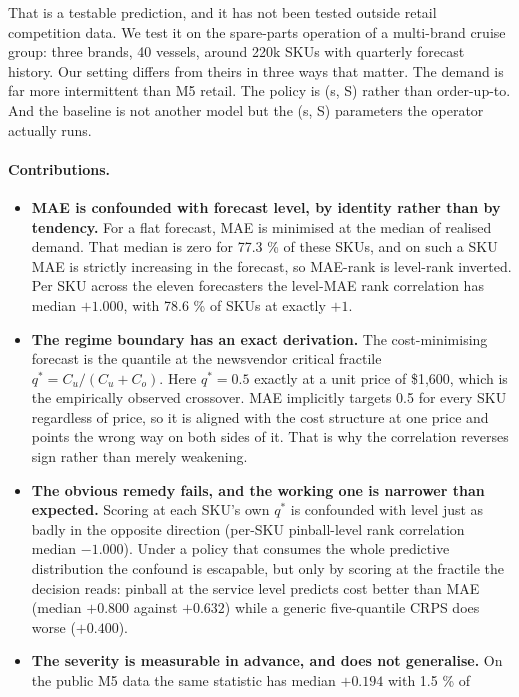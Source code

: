 \documentclass[11pt]{article}
\begin{document}
That is a testable prediction, and it has not been tested outside retail
competition data. We test it on the spare-parts operation of a multi-brand
cruise group: three brands, 40 vessels, around 220k SKUs with quarterly
forecast history. Our setting differs from theirs in three ways that matter.
The demand is far more intermittent than M5 retail. The policy is (s, S) rather
than order-up-to. And the baseline is not another model but the (s, S)
parameters the operator actually runs.

\paragraph{Contributions.}
\begin{itemize}
\item \textbf{MAE is confounded with forecast level, by identity rather than
  by tendency.} For a flat forecast, MAE is minimised at the median of realised
  demand. That median is zero for 77.3 \% of these SKUs, and on such a SKU MAE
  is strictly increasing in the forecast, so MAE-rank is level-rank inverted.
  Per SKU across the eleven forecasters the level-MAE rank correlation has
  median $+1.000$, with 78.6 \% of SKUs at exactly $+1$.
\item \textbf{The regime boundary has an exact derivation.} The
  cost-minimising forecast is the quantile at the newsvendor critical fractile
  $q^\ast = C_u/(C_u+C_o)$. Here $q^\ast = 0.5$ exactly at a unit price of
  \$1{,}600, which is the empirically observed crossover. MAE implicitly
  targets 0.5 for every SKU regardless of price, so it is aligned with the cost
  structure at one price and points the wrong way on both sides of it. That is
  why the correlation reverses sign rather than merely weakening.
\item \textbf{The obvious remedy fails, and the working one is narrower than
  expected.} Scoring at each SKU's own $q^\ast$ is confounded with level just
  as badly in the opposite direction (per-SKU pinball-level rank correlation
  median $-1.000$). Under a policy that consumes the whole predictive
  distribution the confound is escapable, but only by scoring at the fractile
  the decision reads: pinball at the service level predicts cost better than
  MAE (median $+0.800$ against $+0.632$) while a generic five-quantile CRPS
  does worse ($+0.400$).
\item \textbf{The severity is measurable in advance, and does not generalise.}
  On the public M5 data the same statistic has median $+0.194$ with 1.5 \% of

\end{itemize}
\end{document}
